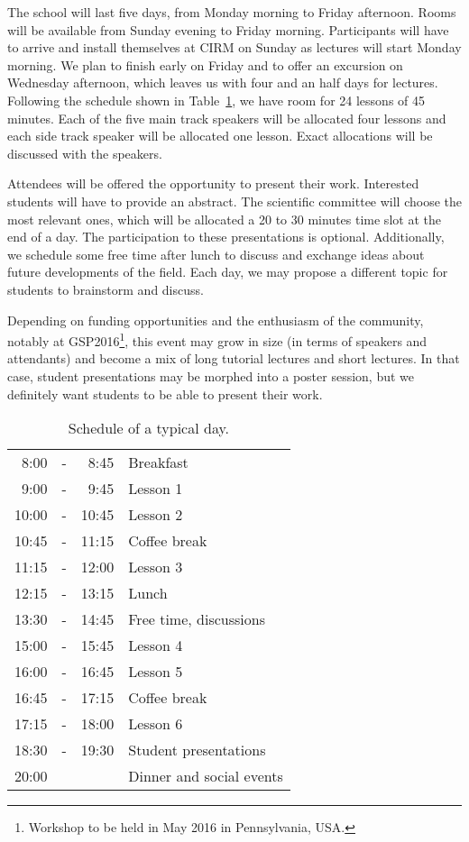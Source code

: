 \documentclass[a4paper]{scrartcl}
\begin{document}
The school will last five days, from Monday morning to Friday afternoon. Rooms
will be available from Sunday evening to Friday morning. Participants will have
to arrive and install themselves at CIRM on Sunday as lectures will start Monday
morning. We plan to finish early on Friday and to offer an excursion on
Wednesday afternoon, which leaves us with four and an half days for lectures.
Following the schedule shown in Table~\ref{schedule}, we have room for 24
lessons of 45 minutes. Each of the five main track speakers will be allocated
four lessons and each side track speaker will be allocated one lesson.
Exact allocations will be discussed with the speakers.

Attendees will be offered the opportunity to present their work. Interested
students will have to provide an abstract. The scientific committee will choose
the most relevant ones, which will be allocated a 20 to 30 minutes time slot at
the end of a day. The participation to these presentations is optional.
Additionally, we schedule some free time after lunch to discuss and exchange
ideas about future developments of the field. Each day, we may propose a
different topic for students to brainstorm and discuss.

Depending on funding opportunities and the enthusiasm of the community, notably
at GSP2016\footnote{Workshop to be held in May 2016 in Pennsylvania, USA.}, this
event may grow in size (in terms of speakers and attendants) and become a mix of
long tutorial lectures and short lectures. In that case, student presentations
may be morphed into a poster session, but we definitely want students to be able
to present their work.

\begin{table}[ht]
	\centering
	\begin{tabular}{rcrl}
	 8:00 & - &  8:45 & Breakfast \\
	 9:00 & - &  9:45 & Lesson 1 \\
	10:00 & - & 10:45 & Lesson 2 \\
	10:45 & - & 11:15 & Coffee break \\
	11:15 & - & 12:00 & Lesson 3 \\
	12:15 & - & 13:15 & Lunch \\
	13:30 & - & 14:45 & Free time, discussions \\
	15:00 & - & 15:45 & Lesson 4 \\
	16:00 & - & 16:45 & Lesson 5 \\
	16:45 & - & 17:15 & Coffee break \\
	17:15 & - & 18:00 & Lesson 6 \\
	18:30 & - & 19:30 & Student presentations \\
	20:00 &   &       & Dinner and social events
	\end{tabular}
	\caption{Schedule of a typical day.}
	\label{schedule}
\end{table}
\end{document}
